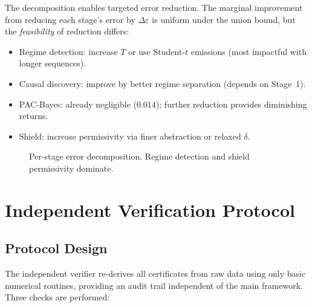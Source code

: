 \documentclass[11pt]{article}
\begin{document}
The decomposition enables targeted error reduction.  The marginal
improvement from reducing each stage's error by $\Delta\varepsilon$
is uniform under the union bound, but the \emph{feasibility} of
reduction differs:
\begin{itemize}[nosep]
  \item Regime detection: increase $T$ or use Student-$t$ emissions
        (most impactful with longer sequences).
  \item Causal discovery: improve by better regime separation
        (depends on Stage~1).
  \item PAC-Bayes: already negligible ($0.014$); further reduction
        provides diminishing returns.
  \item Shield: increase permissivity via finer abstraction or
        relaxed $\delta$.
\end{itemize}

\begin{figure}[h]
\centering
{}
\caption{Per-stage error decomposition.  Regime detection and shield
permissivity dominate.}\label{fig:errorbar}
\end{figure}


\section{Independent Verification Protocol}\label{app:indepverify}

\subsection{Protocol Design}

The independent verifier re-derives all certificates from raw data
using only basic numerical routines, providing an audit trail
independent of the main framework.  Three checks are performed:
\end{document}
